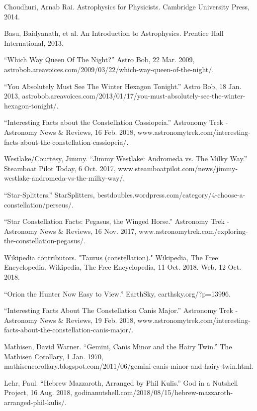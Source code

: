 \documentclass[a4paper,twoside,11pt]{article}
\numberwithin{equation}{section}
\begin{document}
\newpage
\clearpage
\begin{thebibliography}{300}

Choudhuri, Arnab Rai. Astrophysics for Physicists. Cambridge University Press, 2014.

Basu, Baidyanath, et al. An Introduction to Astrophysics. Prentice Hall International, 2013.

“Which Way Queen Of The Night?” Astro Bob, 22 Mar. 2009, astrobob.areavoices.com/2009/03/22/which-way-queen-of-the-night/.

“You Absolutely Must See The Winter Hexagon Tonight.” Astro Bob, 18 Jan. 2013, astrobob.areavoices.com/2013/01/17/you-must-absolutely-see-the-winter-hexagon-tonight/.

“Interesting Facts about the Constellation Cassiopeia.” Astronomy Trek - Astronomy News \& Reviews, 16 Feb. 2018, www.astronomytrek.com/interesting-facts-about-the-constellation-cassiopeia/.

Westlake/Courtesy, Jimmy. “Jimmy Westlake: Andromeda vs. The Milky Way.” Steamboat Pilot Today, 6 Oct. 2017, www.steamboatpilot.com/news/jimmy-westlake-andromeda-vs-the-milky-way/.

“Star-Splitters.” StarSplitters, bestdoubles.wordpress.com/category/4-choose-a-constellation/perseus/.

“Star Constellation Facts: Pegasus, the Winged Horse.” Astronomy Trek - Astronomy News \& Reviews, 16 Nov. 2017, www.astronomytrek.com/exploring-the-constellation-pegasus/.

Wikipedia contributors. "Taurus (constellation)." Wikipedia, The Free Encyclopedia. Wikipedia, The Free Encyclopedia, 11 Oct. 2018. Web. 12 Oct. 2018.

“Orion the Hunter Now Easy to View.” EarthSky, earthsky.org/?p=13996.

“Interesting Facts About The Constellation Canis Major.” Astronomy Trek - Astronomy News \& Reviews, 19 Feb. 2018, www.astronomytrek.com/interesting-facts-about-the-constellation-canis-major/.

Mathisen, David Warner. “Gemini, Canis Minor and the Hairy Twin.” The Mathisen Corollary, 1 Jan. 1970, mathisencorollary.blogspot.com/2011/06/gemini-canis-minor-and-hairy-twin.html.

Lehr, Paul. “Hebrew Mazzaroth, Arranged by Phil Kulis.” God in a Nutshell Project, 16 Aug. 2018, godinanutshell.com/2018/08/15/hebrew-mazzaroth-arranged-phil-kulis/.


\end{thebibliography}
\end{document}
